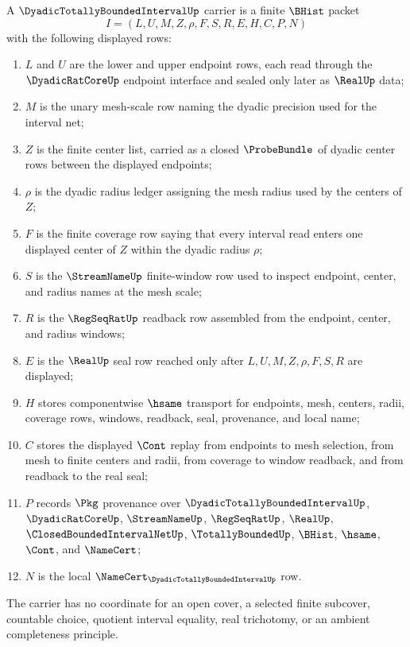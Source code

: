 \begin{definition}
\label{def:dyadic-totally-bounded-interval-carrier}
A $\DyadicTotallyBoundedIntervalUp$ carrier is a finite $\BHist$ packet
$$
I=(L,U,M,Z,\rho,F,S,R,E,H,C,P,N)
$$
with the following displayed rows:
\begin{enumerate}
\item $L$ and $U$ are the lower and upper endpoint rows, each read through the $\DyadicRatCoreUp$ endpoint interface and sealed only later as $\RealUp$ data;
\item $M$ is the unary mesh-scale row naming the dyadic precision used for the interval net;
\item $Z$ is the finite center list, carried as a closed $\ProbeBundle$ of dyadic center rows between the displayed endpoints;
\item $\rho$ is the dyadic radius ledger assigning the mesh radius used by the centers of $Z$;
\item $F$ is the finite coverage row saying that every interval read enters one displayed center of $Z$ within the dyadic radius $\rho$;
\item $S$ is the $\StreamNameUp$ finite-window row used to inspect endpoint, center, and radius names at the mesh scale;
\item $R$ is the $\RegSeqRatUp$ readback row assembled from the endpoint, center, and radius windows;
\item $E$ is the $\RealUp$ seal row reached only after $L,U,M,Z,\rho,F,S,R$ are displayed;
\item $H$ stores componentwise $\hsame$ transport for endpoints, mesh, centers, radii, coverage rows, windows, readback, seal, provenance, and local name;
\item $C$ stores the displayed $\Cont$ replay from endpoints to mesh selection, from mesh to finite centers and radii, from coverage to window readback, and from readback to the real seal;
\item $P$ records $\Pkg$ provenance over $\DyadicTotallyBoundedIntervalUp$, $\DyadicRatCoreUp$, $\StreamNameUp$, $\RegSeqRatUp$, $\RealUp$, $\ClosedBoundedIntervalNetUp$, $\TotallyBoundedUp$, $\BHist$, $\hsame$, $\Cont$, and $\NameCert$;
\item $N$ is the local $\NameCert_{\DyadicTotallyBoundedIntervalUp}$ row.
\end{enumerate}
The carrier has no coordinate for an open cover, a selected finite subcover, countable choice, quotient interval equality, real trichotomy, or an ambient completeness principle.
\end{definition}

